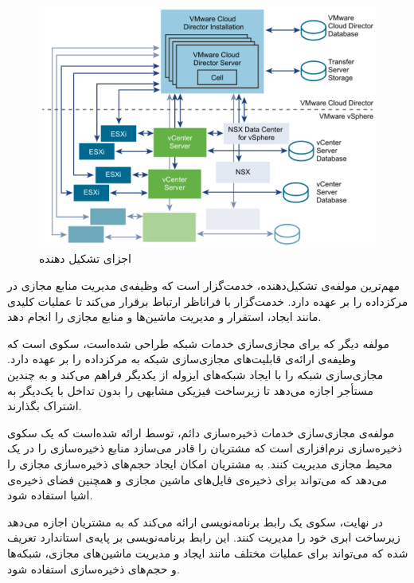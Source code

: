 \begin{figure}[h]
	\vspace{1cm}
	\centering
	\includegraphics[scale=0.7]{figures/vcloud_components.png}
	\caption{اجزای تشکیل دهنده \cite{mstoimenova}}
	\label{fig:vcloud_components}
\end{figure}

مهم‌ترین مولفه‌ی تشکیل‌دهنده، خدمت‌گزار  است که وظیفه‌ی مدیریت منابع مجازی در مرکزداده را بر عهده دارد. خدمت‌گزار  با فراناظر  ارتباط برقرار می‌کند تا عملیات کلیدی مانند ایجاد، استقرار و مدیریت ماشین‌ها و منابع مجازی را انجام دهد.

مولفه دیگر که برای مجازی‌سازی خدمات شبکه طراحی شده‌است، سکوی  است که وظیفه‌ی ارائه‌ی قابلیت‌های مجازی‌سازی شبکه به مرکزداده را بر عهده دارد.  مجازی‌سازی شبکه را با ایجاد شبکه‌های ایزوله از یکدیگر فراهم می‌کند و به چندین مستأجر اجازه می‌دهد تا زیرساخت فیزیکی مشابهی را بدون تداخل با یک‌دیگر به اشتراک بگذارند.

مولفه‌ی مجازی‌سازی‌ خدمات ذخیره‌سازی دائم، توسط  ارائه شده‌است که یک سکو‌ی  ذخیره‌سازی نرم‌افزاری است که مشتریان را قادر می‌سازد منابع ذخیره‌سازی را در یک محیط مجازی مدیریت کنند.  به مشتریان امکان ایجاد حجم‌های ذخیره‌سازی مجازی را می‌دهد که می‌تواند برای ذخیره‌ی فایل‌های ماشین مجازی و همچنین فضای ذخیره‌ی اشیا استفاده شود.

در نهایت، سکو‌ی  یک رابط برنامه‌نویسی ارائه می‌کند که به مشتریان اجازه می‌دهد زیرساخت ابری خود را مدیریت کنند. این رابط برنامه‌نویسی بر پایه‌ی استاندارد  تعریف شده که می‌تواند برای عملیات‌ مختلف مانند ایجاد و مدیریت ماشین‌های مجازی، شبکه‌ها و حجم‌های ذخیره‌سازی استفاده شود.

